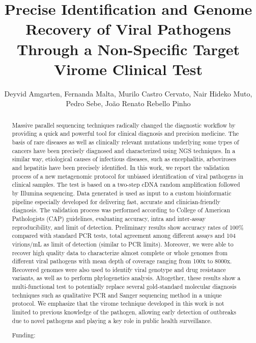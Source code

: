 \documentclass[twoside]{article}
\title{\vspace{-15mm}\fontsize{24pt}{10pt}\selectfont\textbf{ Precise Identification and Genome Recovery of Viral Pathogens Through a Non-Specific Target Virome Clinical Test }} %
\author{ Deyvid Amgarten, Fernanda Malta, Murilo Castro Cervato, Nair Hideko Muto, Pedro Sebe, Jo\~ao Renato Rebello Pinho }
\affil{ Laborat\'orio de T\'ecnicas Especiais,  Hospital Israelita Albert Einstein }
\date{}
\begin{document}
  
  
  \maketitle %
  
  
  \thispagestyle{fancy} %
  
  
  \begin{abstract}
  Massive parallel sequencing techniques radically changed the diagnostic workflow by providing a quick and powerful tool for clinical diagnosis and precision medicine. The basis of rare diseases as well as clinically relevant mutations underlying some types of cancers have been precisely diagnosed and characterized using NGS techniques. In a similar way,  etiological causes of infectious diseases,  such as encephalitis,  arboviroses and hepatitis have been precisely identified. In this work,  we report the validation process of a new metagenomic protocol for unbiased identification of viral pathogens in clinical samples. The test is based on a two-step cDNA random amplification followed by Illumina sequencing. Data generated is used as input to a custom bioinformatic pipeline especially developed for delivering fast,  accurate and clinician-friendly diagnosis. The validation process was performed according to College of American Pathologists (CAP) guidelines,  evaluating accuracy,  intra and inter-assay reproducibility,  and limit of detection. Preliminary results show accuracy rates of 100\% compared with standard PCR tests,  total agreement among different assays and 104 virions/mL as limit of detection (similar to PCR limits). Moreover,  we were able to recover high quality data to characterize almost complete or whole genomes from different viral pathogens with mean depth of coverage ranging from 100x to 8000x. Recovered genomes were also used to identify viral genotype and drug resistance variants,  as well as to perform phylogenetics analysis. Altogether,  these results show a multi-functional test to potentially replace several gold-standard molecular diagnosis techniques such as qualitative PCR and Sanger sequencing method in a unique protocol. We emphasize that the virome technique developed in this work is not limited to previous knowledge of the pathogen,  allowing early detection of outbreaks due to novel pathogens and playing a key role in public health surveillance.
  
  Funding:  \\ 
  \end{abstract}
  
\end{document}
